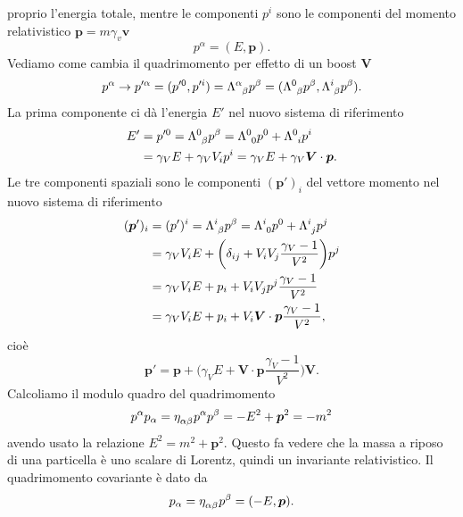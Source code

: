 proprio l'energia totale, mentre le componenti $p^{i}$ sono le componenti del
momento relativistico $\bm{p} = m\gamma_{v}\bm{v}$
\begin{equation}
  p^{\alpha} = (E, \bm{p}).
\end{equation}
Vediamo come cambia il quadrimomento per effetto di un boost $\bm{V}$
\begin{equation}
  p^{\alpha} \to p'^{\alpha} = (p'^{0}, p'^{i}) =
  \tensor{\Lambda}{^{\alpha}_{\beta}} p^{\beta} =
  (\tensor{\Lambda}{^{0}_{\beta}}p^{\beta},
  \tensor{\Lambda}{^{i}_{\beta}}p^{\beta}).
\end{equation}
La prima componente ci dà l'energia $E'$ nel nuovo sistema di riferimento
\begin{equation}
  \begin{split}
    E' &= p'^{0} = \tensor{\Lambda}{^{0}_{\beta}}p^{\beta} =
    \tensor{\Lambda}{^{0}_{0}}p^{0} + \tensor{\Lambda}{^{0}_{i}}p^{i} \\
    &= \gamma_{V} E + \gamma_{V} V_{i}p^{i} = \gamma_{V} E + \gamma_{V}
    \bm{V}\cdot\bm{p}.
  \end{split}
\end{equation}
Le tre componenti spaziali sono le componenti $(\bm{p}')_{i}$ del vettore
momento nel nuovo sistema di riferimento
\begin{equation}
  \begin{split}
    (\bm{p}')_{i} &= (p')^{i} = \tensor{\Lambda}{^{i}_{\beta}}p^{\beta} =
    \tensor{\Lambda}{^{i}_{0}}p^{0} + \tensor{\Lambda}{^{i}_{j}}p^{j} \\
    &= \gamma_{V} V_{i}E + \bigg( \delta_{ij} +
    V_{i}V_{j}\frac{\gamma_{V}-1}{V^{2}}\bigg)p^{j} \\
    &= \gamma_{V} V_{i}E + p_{i} +
    V_{i}V_{j}p^{j}\frac{\gamma_{V}-1}{V^{2}} \\
    &= \gamma_{V} V_{i}E + p_{i} + V_{i} \bm{V} \cdot \bm{p}
    \frac{\gamma_{V}-1}{V^{2}},
  \end{split}
\end{equation}
cioè
\begin{equation}
  \bm{p}' = \bm{p} + \bigg(\gamma_{V} E + \bm{V} \cdot \bm{p}
  \frac{\gamma_{V}-1}{V^{2}}\bigg)\bm{V}.
\end{equation}
Calcoliamo il modulo quadro del quadrimomento
\begin{equation}
  p^{\alpha}p_{\alpha} = \tensor{\eta}{_{\alpha\beta}}p^{\alpha}p^{\beta} =
  -E^{2} + \bm{p}^{2} = -m^{2}
\end{equation}
avendo usato la relazione $E^{2} = m^{2} + \bm{p}^{2}$.  Questo fa vedere che la
massa a riposo di una particella è uno scalare di Lorentz, quindi un invariante
relativistico.  Il quadrimomento covariante è dato da
\begin{equation}
  p_{\alpha} = \tensor{\eta}{_{\alpha\beta}}p^{\beta} = (-E, \bm{p}).
\end{equation}

